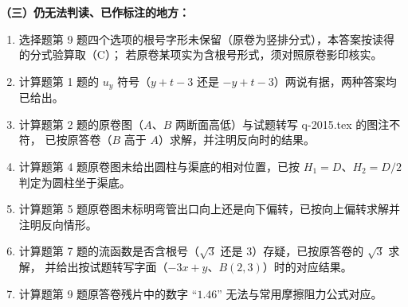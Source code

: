 \begin{tishi}
\textbf{（三）仍无法判读、已作标注的地方：}
\begin{enumerate}
  \item 选择题第 9 题四个选项的根号字形未保留（原卷为竖排分式），本答案按读得的分式验算取（C）；
    若原卷某项实为含根号形式，须对照原卷影印核实。
  \item 计算题第 1 题的 $u_y$ 符号（$y+t-3$ 还是 $-y+t-3$）两说有据，两种答案均已给出。
  \item 计算题第 2 题的原卷图（$A$、$B$ 两断面高低）与试题转写 q-2015.tex 的图注不符，
    已按原答卷（$B$ 高于 $A$）求解，并注明反向时的结果。
  \item 计算题第 4 题原卷图未给出圆柱与渠底的相对位置，已按 $H_1=D$、$H_2=D/2$ 判定为圆柱坐于渠底。
  \item 计算题第 5 题原卷图未标明弯管出口向上还是向下偏转，已按向上偏转求解并注明反向情形。
  \item 计算题第 7 题的流函数是否含根号（$\sqrt{3}$ 还是 $3$）存疑，已按原答卷的 $\sqrt{3}$ 求解，
    并给出按试题转写字面（$-3x+y$、$B(2,3)$）时的对应结果。
  \item 计算题第 9 题原答卷残片中的数字 ``$1.46$'' 无法与常用摩擦阻力公式对应。
\end{enumerate}
\end{tishi}
